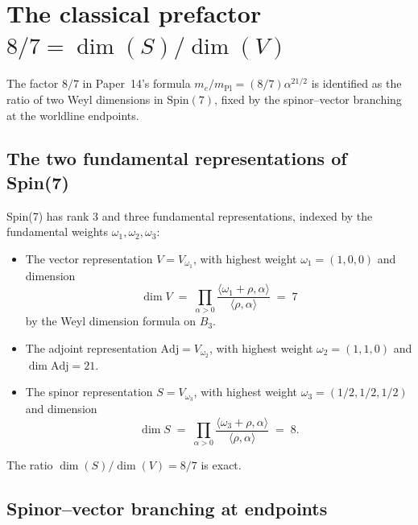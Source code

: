 \documentclass[11pt]{article}
\newcommand{\Spin}{\mathrm{Spin}}
\newcommand{\Adj}{\mathrm{Adj}}
\newcommand{\mPl}{m_{\mathrm{Pl}}}
\begin{document}
\section{The classical prefactor $8/7 = \dim(S)/\dim(V)$}
\label{sec:prefactor-87}

The factor $8/7$ in Paper~14's formula $m_e/\mPl = (8/7) \alpha^{21/2}$
is identified as the ratio of two Weyl dimensions in $\Spin(7)$,
fixed by the spinor--vector branching at the worldline endpoints.

\subsection{The two fundamental representations of Spin(7)}

Spin(7) has rank 3 and three fundamental representations, indexed
by the fundamental weights $\omega_1, \omega_2, \omega_3$:
\begin{itemize}
\item The vector representation $V = V_{\omega_1}$, with highest
  weight $\omega_1 = (1, 0, 0)$ and dimension
  \begin{equation}
    \dim V \;=\; \prod_{\alpha > 0}
      \frac{\langle \omega_1 + \rho, \alpha \rangle}
           {\langle \rho, \alpha \rangle}
    \;=\; 7
  \end{equation}
  by the Weyl dimension formula on $B_3$.
\item The adjoint representation $\Adj = V_{\omega_2}$, with
  highest weight $\omega_2 = (1, 1, 0)$ and $\dim \Adj = 21$.
\item The spinor representation $S = V_{\omega_3}$, with highest
  weight $\omega_3 = (1/2, 1/2, 1/2)$ and dimension
  \begin{equation}
    \dim S \;=\; \prod_{\alpha > 0}
      \frac{\langle \omega_3 + \rho, \alpha \rangle}
           {\langle \rho, \alpha \rangle}
    \;=\; 8.
  \end{equation}
\end{itemize}
The ratio $\dim(S)/\dim(V) = 8/7$ is exact.

\subsection{Spinor--vector branching at endpoints}
\end{document}
